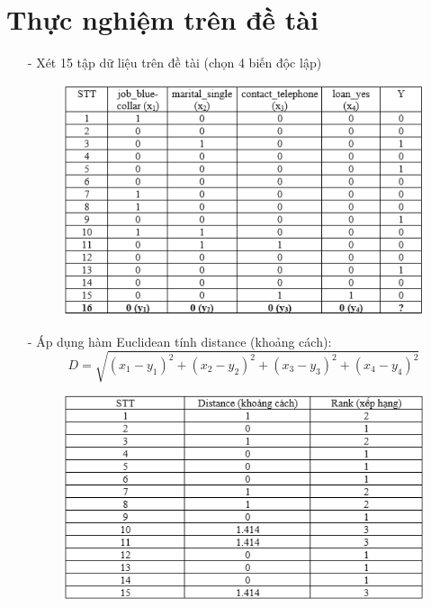 \documentclass{report}
\begin{document}
    \section{Thực nghiệm trên đề tài}
        \fontsize{13}{10}\selectfont
        \begin{enumerate}
            \item [- ] Xét 15 tập dữ liệu trên đề tài (chọn 4 biến độc lập)
                \begin{center}
                    \begin{figure}[htp]
                        \begin{center}
                            \includegraphics[scale = 1]{image/input_thucnghiem.PNG}
                        \end{center}
                    \end{figure}
                \end{center}
                
            \item [- ] Áp dụng hàm Euclidean tính distance (khoảng cách):
                $$D = \sqrt{(x_1 - y_1)^2 + (x_2 - y_2)^2 + (x_3 - y_3)^2 + (x_4 - y_4)^2}$$
                \begin{center}
                    \begin{figure}[htp]
                        \begin{center}
                            \includegraphics[scale = 1]{image/result_after_using_Euclidean.PNG}
                        \end{center}
                    \end{figure}
                \end{center}
                

\end{enumerate}
\end{document}
